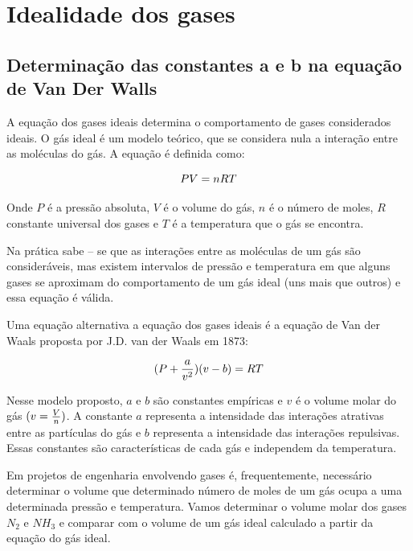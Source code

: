 \section{Idealidade dos gases}
	
\subsection{Determinação das constantes a e b na equação de Van Der Walls}

A equação dos gases ideais determina o comportamento de gases considerados ideais. O gás ideal é um modelo teórico, que se considera nula a interação entre as moléculas do gás. A equação é definida como:

$$\Large PV=nRT$$

Onde $P$ é a pressão absoluta,  $V$ é o volume do gás,  $n$ é o número de moles, $R$ constante universal dos gases e $T$ é a temperatura que o gás se encontra. 

Na prática sabe – se que as interações entre as moléculas de um gás são consideráveis, mas existem intervalos de pressão e temperatura em que alguns gases se aproximam do comportamento de um gás ideal (uns mais que outros) e essa equação é válida.

Uma equação alternativa a equação dos gases ideais é a equação de Van der Waals proposta por J.D. van der Waals em 1873:

$$\Large (P + \frac{a}{v^{2}} )(v-b)=RT$$

Nesse modelo proposto, $a$ e $b$ são constantes empíricas e $v$ é o volume molar do gás $(\large v=\frac{V}{n})$. A constante $a$ representa a intensidade das interações atrativas entre as partículas do gás e $b$ representa a intensidade das interações repulsivas. Essas constantes são características de cada gás e independem da temperatura.

Em projetos de engenharia envolvendo gases é, frequentemente, necessário determinar o volume que determinado número de moles de um gás ocupa a uma determinada pressão e temperatura. 
Vamos determinar o volume molar dos gases $N_{2}$ e $NH_{3}$ e comparar com o volume de um gás ideal calculado a partir da equação do gás ideal.

